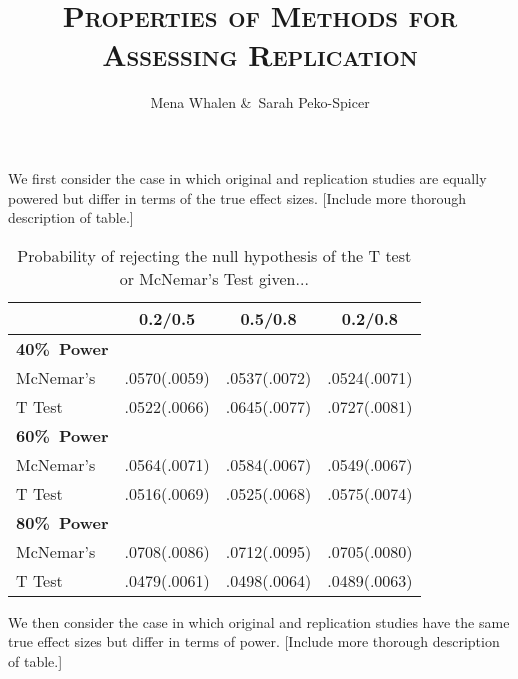 \documentclass{article}
\title{\textsc{Properties of Methods for Assessing Replication}}
\author{Mena Whalen \&\ Sarah Peko-Spicer}
\begin{document}
\maketitle

We first consider the case in which original and replication studies are equally powered but differ in terms of the true effect sizes. [Include more thorough description of table.]

\begin{table}[h!]
\centering
\begin{tabular}{ | l | c | c | c |}
\hline\hline
& \textbf{0.2/0.5} & \textbf{0.5/0.8} & \textbf{0.2/0.8} \\
\hline
\textbf{40\%\ Power} & & & \\
\hspace{3mm} McNemar's & .0570(.0059) & .0537(.0072) & .0524(.0071) \\
\hspace{3mm} T Test & .0522(.0066) & .0645(.0077) & .0727(.0081) \\
\hline
\textbf{60\%\ Power} & & & \\
\hspace{3mm} McNemar's & .0564(.0071) & .0584(.0067) & .0549(.0067)  \\
\hspace{3mm} T Test & .0516(.0069) & .0525(.0068) & .0575(.0074) \\
\hline
\textbf{80\%\ Power} & & & \\
\hspace{3mm} McNemar's & .0708(.0086) & .0712(.0095) & .0705(.0080)  \\
\hspace{3mm} T Test & .0479(.0061) & .0498(.0064) & .0489(.0063) \\
\hline\hline
\end{tabular}
\caption{Probability of rejecting the null hypothesis of the T test or McNemar's Test given...}
\end{table}

We then consider the case in which original and replication studies have the same true effect sizes but differ in terms of power. [Include more thorough description of table.]
\end{document}
